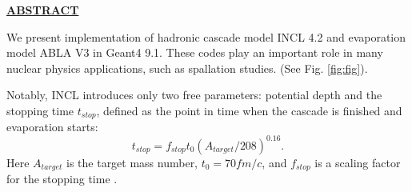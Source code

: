 \documentclass[10pt]{article}
\newenvironment{textbox}
{\begin{lrbox}{\dummybox}\begin{minipage}{0.9\columnwidth}}
{\end{minipage}\end{lrbox}\raisebox{-\depth}{\psshadowbox[framesep=1em,framearc=.1,shadow=true]{\usebox{\dummybox}}}\vspace{0.005\textheight}}
\begin{document}
\begin{center}
\begin{multicols}{3}
\begin{textbox}
\begin{center}
\textbf{\Large\color{udsubsect}\underline{ABSTRACT}}
\end{center}

{\color{udsect}
We present implementation of hadronic cascade model INCL 4.2
\cite{incl} and evaporation model ABLA V3 \cite{abla} in Geant4 9.1.
These codes play an important role in many nuclear physics
applications, such as spallation studies. (See Fig. \ref{fig:fig}).
%
%
%

Notably, INCL introduces only two free parameters: potential depth
and the stopping time
$t_{stop}$, defined as the point in time when the cascade is
finished and evaporation starts:
\begin{equation}
t_{stop} = f_{stop}t_0 (A_{target}/208) ^{0.16}.
\end{equation}
Here $A_{target}$ is the target mass number, $t_0 = 70 fm/c$, and
$f_{stop}$ is a scaling factor for the stopping time \cite{g4physref}.
}

\end{textbox}
\begin{textbox}


\end{textbox}
\end{multicols}
\end{center}
\end{document}
